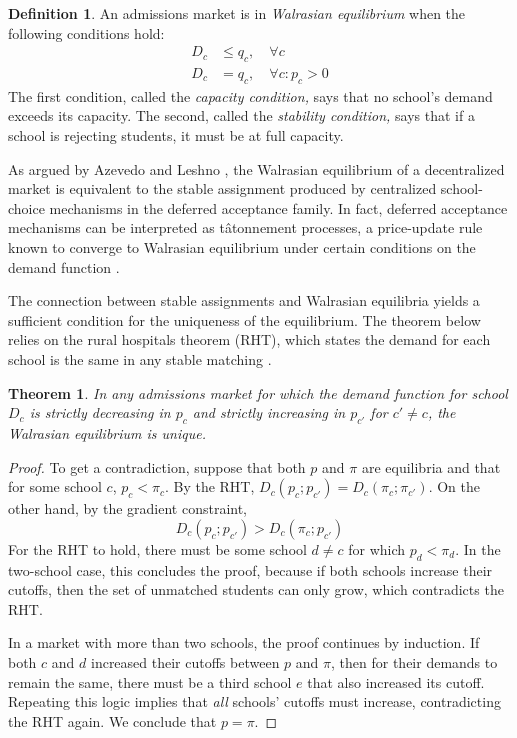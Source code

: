 \documentclass[12pt]{article}
\numberwithin{equation}{subsection}
\newtheorem{theorem}{Theorem}
\theoremstyle{definition}
\newtheorem{definition}{Definition}
\begin{document}
\begin{definition} \label{marketeqconditions} An admissions market is in \emph{Walrasian equilibrium} when the following conditions hold:
\begin{align} D_c &\leq q_c, \quad \forall c \label{capacitycondition} \\
D_c &= q_c, \quad \forall c: p_c > 0 \label{stabilitycondition}
\end{align}
The first condition, called the \emph{capacity condition,} says that no school's demand exceeds its capacity. The second, called the \emph{stability condition,} says that if a school is rejecting students, it must be at full capacity.
\end{definition}

As argued by Azevedo and Leshno \parencite*{supplydemandfw}, the Walrasian equilibrium of a decentralized market is equivalent to the stable assignment produced by centralized school-choice mechanisms in the deferred acceptance family. In fact, deferred acceptance mechanisms can be interpreted as t\^{a}tonnement processes, a price-update rule known to converge to Walrasian equilibrium under certain conditions on the demand function \parencites[][\S2.4]{characterizingnonatomic}[][]{walrastatonnement}.

The connection between stable assignments and Walrasian equilibria yields a sufficient condition for the uniqueness of the equilibrium. The theorem below relies on the rural hospitals theorem (RHT), which states the demand for each school is the same in any stable matching \parencite[][]{ruralhospitalstheorem}.

\begin{theorem} \label{equilibriumuniquenesstheorem}
In any admissions market for which the demand function for school $D_c$ is strictly decreasing in $p_c$ and strictly increasing in $p_{c'}$ for $c' \neq c$, the Walrasian equilibrium is unique.
\end{theorem} 

\begin{proof}
To get a contradiction, suppose that both $p$ and $\pi$ are equilibria and that for some school $c$, $p_c < \pi_c$. By the RHT, $D_c(p_c; p_{c'}) = D_c(\pi_c; \pi_{c'})$. On the other hand, by the gradient constraint,\[D_c(p_c; p_{c'}) > D_c(\pi_c; p_{c'})\]
For the RHT to hold, there must be some school $d \neq c$ for which $p_d < \pi_d$. In the two-school case, this concludes the proof, because if both schools increase their cutoffs, then the set of unmatched students can only grow, which contradicts the RHT.

In a market with more than two schools, the proof continues by induction. If both $c$ and $d$ increased their cutoffs between $p$ and $\pi$, then for their demands to remain the same, there must be a third school $e$ that also increased its cutoff. Repeating this logic implies that \emph{all} schools' cutoffs must increase, contradicting the RHT again. We conclude that $p = \pi$.
\end{proof}
\end{document}
